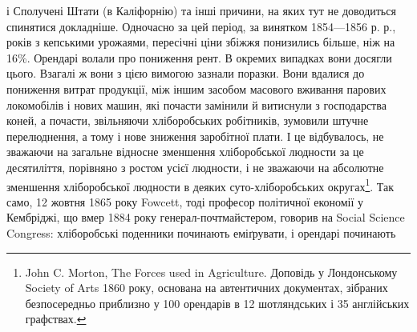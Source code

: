 і Сполучені Штати (в Каліфорнію) та інші причини, на яких тут не доводиться
спинятися докладніше. Одночасно за цей період, за винятком 1854—1856 р. р., років
з кепськими урожаями, пересічні ціни збіжжя понизились більше, ніж на 16\%.
Орендарі волали про пониження рент. В окремих випадках вони досягли цього.
Взагалі ж вони з цією вимогою зазнали поразки. Вони вдалися до пониження
витрат продукції, між іншим засобом масового вживання парових
локомобілів і нових машин, які почасти замінили й витиснули з господарства
коней, а почасти, звільняючи хліборобських робітників, зумовили
штучне перелюднення, а тому і нове зниження заробітної плати. І це відбувалось,
не зважаючи на загальне відносне зменшення хліборобської людности за це
десятиліття, порівняно з ростом усієї людности, і не зважаючи на абсолютне зменшення
хліборобської людности в деяких суто-хліборобських округах\footnote{
John C. Morton, The Forces used in Agriculture. Доповідь у Лондонському Society of Arts 1860
року, основана на автентичних документах, зібраних безпосередньо приблизно у 100 орендарів в 12
шотляндських і 35 англійських графствах.
}. Так
само, 12 жовтня 1865 року Fowcett, тоді професор політичної економії у Кембріджі,
що вмер 1884 року генерал-почтмайстером, говорив на Social Science
Congress: хліборобські поденники починають еміґрувати, і орендарі починають
\parbreak{}  %
